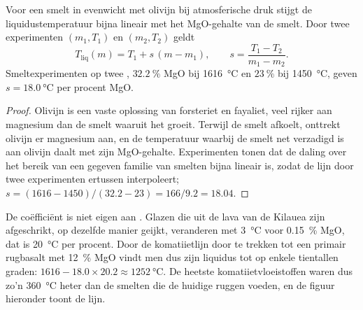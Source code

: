\begin{proposition}[De komatiietthermometer]\label{prop:b2:precambrian-earth:liquidus}
Voor een smelt in evenwicht met olivijn bij atmosferische druk stijgt de liquidustemperatuur
bijna lineair met het MgO-gehalte van de smelt. Door twee experimenten $(m_1, T_1)$ en
$(m_2, T_2)$ geldt
\[
  T_{\text{liq}}(m) = T_1 + s\,(m - m_1), \qquad s = \frac{T_1 - T_2}{m_1 - m_2} .
\]
Smeltexperimenten op twee , $\qty{32.2}{\percent}$ MgO bij \qty{1616}{\celsius} en
$\qty{23}{\percent}$ bij \qty{1450}{\celsius}, geven $s = \qty{18.0}{\celsius}$ per procent
MgO.
\end{proposition}

\begin{proof}
Olivijn is een vaste oplossing van forsteriet en fayaliet, veel rijker aan magnesium dan de smelt
waaruit het groeit. Terwijl de smelt afkoelt, onttrekt olivijn er magnesium aan, en de temperatuur
waarbij de smelt net verzadigd is aan olivijn daalt met zijn MgO-gehalte. Experimenten tonen dat
de daling over het bereik van een gegeven familie van smelten bijna lineair is, zodat de lijn door
twee experimenten ertussen interpoleert; $s = (1616 - 1450)/(32.2 - 23) = 166/9.2 = 18.04$.
\end{proof}

De coëfficiënt is niet eigen aan . Glazen die uit de lava van de Kilauea zijn afgeschrikt,
op dezelfde manier geijkt, veranderen met \qty{3}{\celsius} voor \qty{0.15}{\percent} MgO, dat
is \qty{20}{\celsius} per procent. Door de komatiietlijn door te trekken tot een primair rugbasalt
met \qty{12}{\percent} MgO vindt men dus zijn liquidus tot op enkele tientallen graden: $1616 -
18.0\times20.2 \approx \qty{1252}{\celsius}$. De heetste komatiietvloeistoffen waren dus
zo'n \qty{360}{\celsius} heter dan de smelten die de huidige ruggen voeden, en de figuur hieronder
toont de lijn.

